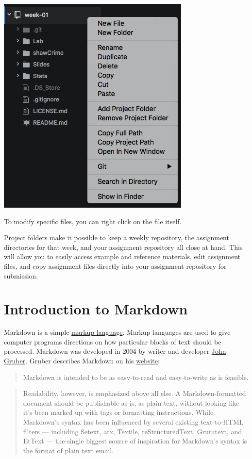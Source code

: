 \documentclass[]{book}
\theoremstyle{definition}
\theoremstyle{definition}
\theoremstyle{remark}
\begin{document}
\includegraphics[width=0.75\linewidth]{images/atomProject}

To modify specific files, you can right click on the file itself.

Project folders make it possible to keep a weekly repository, the
assignment directories for that week, and your assignment repository all
close at hand. This will allow you to easily access example and
reference materials, edit assignment files, and copy assignment files
directly into your assignment repository for submission.

\chapter{Introduction to Markdown}\label{introduction-to-markdown}

Markdown is a simple
\href{https://en.wikipedia.org/wiki/Markup_language}{markup language}.
Markup languages are used to give computer programs directions on how
particular blocks of text should be processed. Markdown was developed in
2004 by writer and developer \href{http://daringfireball.net}{John
Gruber}. Gruber describes Markdown on his
\href{http://daringfireball.net/projects/markdown/}{website}:

\begin{quote}
Markdown is intended to be as easy-to-read and easy-to-write as is
feasible.
\end{quote}

\begin{quote}
Readability, however, is emphasized above all else. A Markdown-formatted
document should be publishable as-is, as plain text, without looking
like it's been marked up with tags or formatting instructions. While
Markdown's syntax has been influenced by several existing text-to-HTML
filters --- including Setext, atx, Textile, reStructuredText, Grutatext,
and EtText --- the single biggest source of inspiration for Markdown's
syntax is the format of plain text email.
\end{quote}
\end{document}
